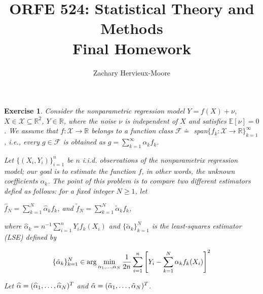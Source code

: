 \documentclass[12pt]{article}
\title{ORFE 524: Statistical Theory and Methods \\ Final Homework}
\author{Zachary Hervieux-Moore}
\date{\displaydate{date}}
\theoremstyle{colon}
\newtheorem{exercise}{Exercise}
\begin{document}
\maketitle

\clearpage

\begin{exercise}
  Consider the nonparametric regression model $Y = f(X) + \nu$, $X \in \mathcal{X} \subseteq \mathbb{R}^2$, $Y \in \mathbb{R}$, where the noise $\nu$ is independent of $X$ and satisfies $\mathbb{E}[\nu] = 0$. We assume that $f: \mathcal{X} \rightarrow \mathbb{R}$ belongs to a function class $\mathcal{F} \doteq$ span$\{f_k : \mathcal{X} \rightarrow \mathbb{R}\}_{k=1}^\infty$, i.e., every $g \in \mathcal{F}$ is obtained as $g = \sum_{k=1}^\infty \alpha_k f_k$.

  Let $\{(X_i, Y_i)\}_{i=1}^n$ be $n$ i.i.d. observations of the nonparametrix regression model; our goal is to estimate the function $f$, in other words, the unknown coefficients $\alpha_k$. The point of this problem is to compare two different estimators defied as follows: for a fixed integer $N \geq 1$, let

  \begin{center}
    $\widehat{f}_N = \sum_{k=1}^N \widehat{\alpha}_k f_k$, and $\tilde{f}_N = \sum_{k=1}^N \tilde{\alpha}_k f_k$,
  \end{center}

  where $\widehat{\alpha}_k = n^{-1} \sum_{i=1}^n Y_i f_k(X_i)$ and $\{\tilde{\alpha}_k\}_{k=1}^N$ is the least-squares estimator (LSE) defined by

  \begin{equation}
    \{\tilde{\alpha}_k\}_{k=1}^N \in \arg\min_{\alpha_1, \mathellipsis, \alpha_N} \frac{1}{2n} \sum_{i=1}^n \left[Y_i - \sum_{k=1}^N \alpha_k f_k(X_i) \right]^2
  \end{equation}

  Let $\widehat{\alpha} = (\widehat{\alpha}_1, \mathellipsis, \widehat{\alpha}_N)^T$ and $\tilde{\alpha} = (\tilde{\alpha}_1, \mathellipsis, \tilde{\alpha}_N)^T$.


\end{exercise}
\end{document}
